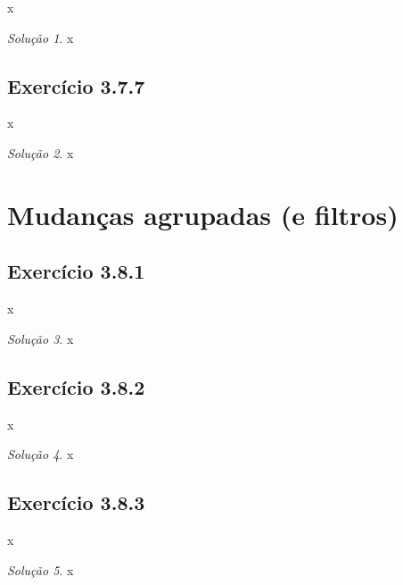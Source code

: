 \documentclass[
]{latex/krantz}
\theoremstyle{definition}
\theoremstyle{definition}
\theoremstyle{definition}
\theoremstyle{definition}
\theoremstyle{remark}
\newtheorem*{solution}{Solução}
\begin{document}
x

\begin{solution}
x
\end{solution}

\hypertarget{exr3-7-7}{%
\subsection*{Exercício 3.7.7}\label{exr3-7-7}}

x

\begin{solution}
x
\end{solution}

\hypertarget{mudanuxe7as-agrupadas-e-filtros}{%
\section{Mudanças agrupadas (e filtros)}\label{mudanuxe7as-agrupadas-e-filtros}}

\hypertarget{exr3-8-1}{%
\subsection*{Exercício 3.8.1}\label{exr3-8-1}}

x

\begin{solution}
x
\end{solution}

\hypertarget{exr3-8-2}{%
\subsection*{Exercício 3.8.2}\label{exr3-8-2}}

x

\begin{solution}
x
\end{solution}

\hypertarget{exr3-8-3}{%
\subsection*{Exercício 3.8.3}\label{exr3-8-3}}

x

\begin{solution}
x
\end{solution}
\end{document}
